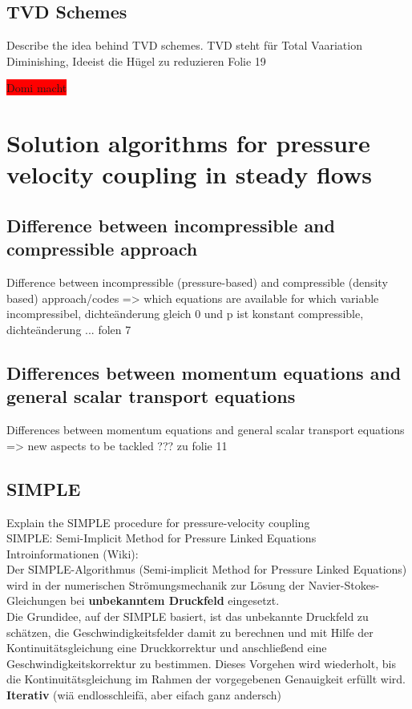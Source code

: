 \documentclass[a4paper]{scrartcl}
\begin{document}
\subsection{TVD Schemes} Describe the idea behind TVD schemes.
TVD steht für Total Vaariation Diminishing,
Ideeist die Hügel zu reduzieren
Folie 19


\colorbox{red}{Domi macht}


\section{Solution algorithms for pressure velocity coupling in steady flows}
\subsection{Difference between incompressible and compressible approach}
Difference between incompressible (pressure-based) and compressible (density based) approach/codes => which equations are available for which variable
incompressibel, dichteänderung gleich 0 und p ist konstant
compressible, dichteänderung ...
folen 7


\subsection{Differences between momentum equations and general scalar transport
equations} 
Differences between momentum equations and general scalar transport
equations => new aspects to be tackled ??? zu folie 11

\subsection{SIMPLE}
Explain the SIMPLE procedure for pressure-velocity coupling\\
\newline
SIMPLE: Semi-Implicit Method for Pressure Linked Equations\\
Introinformationen (Wiki):\\
Der SIMPLE-Algorithmus (Semi-implicit Method for Pressure Linked Equations) wird
in der numerischen Strömungsmechanik zur Lösung der Navier-Stokes-Gleichungen
bei \textbf{unbekanntem Druckfeld} eingesetzt.\\
Die Grundidee, auf der SIMPLE basiert, ist das unbekannte Druckfeld zu schätzen,
die Geschwindigkeitsfelder damit zu berechnen und mit Hilfe der
Kontinuitätsgleichung eine Druckkorrektur und anschließend eine
Geschwindigkeitskorrektur zu bestimmen. Dieses Vorgehen wird wiederholt, bis die
Kontinuitätsgleichung im Rahmen der vorgegebenen Genauigkeit erfüllt wird.\\
\textbf{Iterativ} (wiä endlosschleifä, aber eifach ganz andersch)\\
\end{document}
